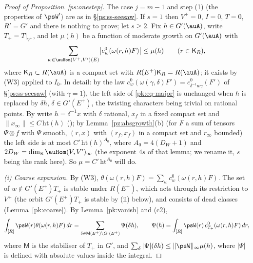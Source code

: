 \documentclass[10pt]{amsart}
\theoremstyle{definition}
\theoremstyle{remark}
\newcommand{\R}{\mathbb R}
\begin{document}
\begin{proof}[Proof of Proposition~\ref{ps:onestep}]
The case $j=m-1$ and step (1) (the properties of $\psW'$) are as in \S\ref{ps:ss-seesaw}. If
$s=1$ then $V^+=0$, $I=0$, $T=0$, $R'=G'$ and there is nothing to prove; let $s\ge2$. Fix
$h\in G'(\auA)$, write $T_+=T|_{V^+}$, and let $\mu(h)$ be a function of moderate growth on
$G'(\auA)$ with
\begin{equation}\label{pk:eq-major}
\sum_{w\in\auHom(V^+,V')(E)}\bigl|c^0_w(\omega(r,h)F)\bigr|\le\mu(h)\qquad(r\in\mathsf K_R),
\end{equation}
where $\mathsf K_R\subset R(\auA)$ is a compact set with $R(E^+)\mathsf K_R=R(\auA)$; it exists by
(W3) applied to $I_0$. In detail: by the law $c^0_w(\omega(\gamma,\delta)F')=c^0_{\delta^{-1}w\gamma}(F')$ of
\S\ref{ps:ss-seesaw} (with $\gamma=1$), the left side of \eqref{pk:eq-major} is unchanged when $h$ is
replaced by $\delta h$, $\delta\in G'(E^+)$, the twisting characters being trivial on rational points.
By {\cite[Lemma~3.28]{P53}} write $h=\delta^{-1}x$ with $\delta$ rational, $x_f$ in a fixed compact set and
$\|x_\infty\|\le C\,\mathrm{ht}(h)$ ({\cite[Definition~3.27]{P53}}); by Lemma~\ref{pz:absgrowth}(b) (for
$F$ a sum of tensors $\Psi\otimes f$ with $\Psi$ smooth, $(r,x)$ with $(r_f,x_f)$ in a compact set and
$r_\infty$ bounded) the left side is at most $C'\,\mathrm{ht}(h)^{A_0}$, where $A_0=4(D_W+1)$ and $2D_W=\dim_\R\auHom(V,V')_\infty$ (the exponent $4s$ of that lemma; we rename it, $s$ being the rank here). So $\mu=C'\,\mathrm{ht}^{A_0}$ will do.

\emph{(i) Coarse expansion.} By (W3), $\theta(\omega(r,h)F)=\sum_wc^0_w(\omega(r,h)F)$. The set of
$w\notin G'(E^+)T_+$ is stable under $R(E^+)$, which acts through its restriction to $V^+$ (the
orbit $G'(E^+)T_+$ is stable by (ii) below), and consists of dead classes
(Lemma~\ref{pk:coarse}). By Lemma~\ref{pk:vanish} and (c2),
\[
\int_{[R]}\psW(r)\theta(\omega(r,h)F)\,dr=\sum_{\delta\in\mathsf M(E^+)\backslash G'(E^+)}\Psi(\delta h),
\qquad\Psi(h)=\int_{[R]}\psW(r)\,c^0_{T_+}(\omega(r,h)F)\,dr,
\]
where $\mathsf M$ is the stabiliser of $T_+$ in $G'$, and $\sum_\delta|\Psi|(\delta h)\le\|\psW
\|_\infty\mu(h)$, where $|\Psi|$ is defined with absolute values inside the integral.


\end{proof}
\end{document}
